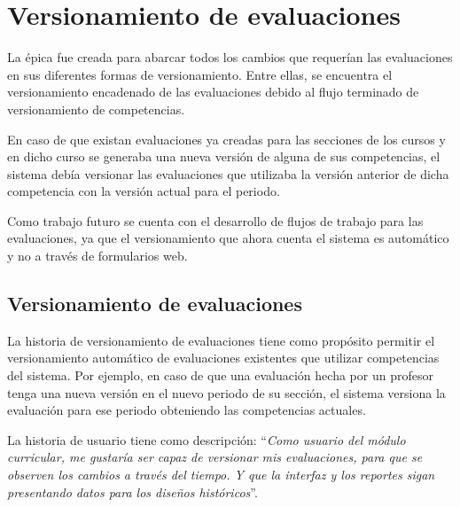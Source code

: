 \section{Versionamiento de evaluaciones}
La épica fue creada para abarcar todos los cambios que requerían las evaluaciones en sus diferentes formas de versionamiento. Entre ellas, se encuentra el versionamiento encadenado de las evaluaciones debido al flujo terminado de versionamiento de competencias. 

En caso de que existan evaluaciones ya creadas para las secciones de los cursos y en dicho curso se generaba una nueva versión de alguna de sus competencias, el sistema debía versionar las evaluaciones que utilizaba la versión anterior de dicha competencia con la versión actual para el periodo.

Como trabajo futuro se cuenta con el desarrollo de flujos de trabajo para las evaluaciones, ya que el versionamiento que ahora cuenta el sistema es automático y no a través de formularios web.

\begin{table}[H]
\centering
\caption{Historias de usuario para el versionamiento encadenado de evaluaciones debido al versionamiento de competencias}
\label{epic:5}
\end{table}

\subsection{Versionamiento de evaluaciones} \label{versionamiento_encadenado}
La historia de versionamiento de evaluaciones tiene como propósito permitir el versionamiento automático de evaluaciones existentes que utilizar competencias del sistema. Por ejemplo, en caso de que una evaluación hecha por un profesor tenga una nueva versión en el nuevo periodo de su sección, el sistema versiona la evaluación para ese periodo obteniendo las competencias actuales.

La historia de usuario tiene como descripción: \enquote{\textit{Como usuario del módulo curricular, me gustaría ser capaz de versionar mis evaluaciones, para que se observen los cambios a través del tiempo. Y que la interfaz y los reportes sigan presentando datos para los diseños históricos}}.

